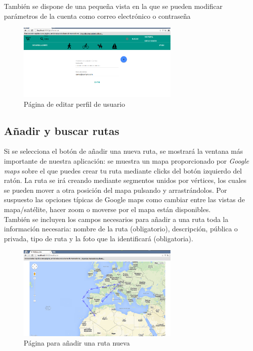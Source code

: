 \documentclass[11pt,a4paper]{article}
\begin{document}
También se dispone de una pequeña vista en la que se pueden modificar parámetros de la cuenta como correo electrónico o contraseña
\begin{figure}[h]
\centering
  \includegraphics[width=0.7\textwidth]{./imagenes/editar}
  \caption{Página de editar perfil de usuario}
  \label{fig: Página de editar perfil de usuario}
\end{figure}
\clearpage
\subsection{Añadir y buscar rutas}
Si se selecciona el botón de añadir una nueva ruta, se mostrará la ventana más importante de nuestra aplicación: se muestra un mapa proporcionado por \textit{Google maps} sobre el que puedes crear tu ruta mediante clicks del botón izquierdo del ratón. La ruta se irá creando mediante segmentos unidos por vértices, los cuales se pueden mover a otra posición del mapa pulsando y arrastrándolos. Por suspuesto las opciones típicas de Google maps como cambiar entre las vistas de mapa/satélite, hacer zoom o moverse por el mapa están disponibles.\\
También se incluyen los campos necesarios para añadir a una ruta toda la información necesaria: nombre de la ruta (obligatorio), descripción, pública o privada, tipo de ruta y la foto que la identificará (obligatoria).\\

\begin{figure}[h]
\centering
  \includegraphics[width=0.7\textwidth]{./imagenes/anadir}
  \caption{Página para añadir una ruta nueva}
  \label{fig: Página para añadir una ruta nueva}
\end{figure}
\end{document}
